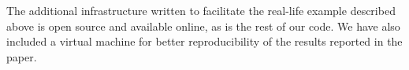 \begin{authors}
The additional infrastructure written to facilitate the real-life example
described above is open source and available online, as is the rest of our code.
We have also included a virtual machine for better reproducibility of the
results reported in the paper.

\begin{actions}

\end{actions}
\end{authors}
